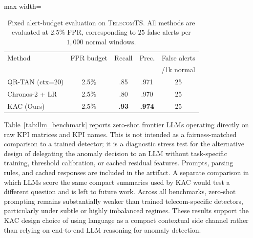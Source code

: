 \documentclass[conference]{IEEEtran}
\begin{document}
\begin{table}[t]
  \centering
  \caption{Fixed alert-budget evaluation on \textsc{TelecomTS}. All methods are evaluated at $2.5\%$ FPR, corresponding to $25$ false alerts per $1{,}000$ normal windows.}
  \label{tab:alert_budget}
  \small
  \setlength{\tabcolsep}{4pt}
  \begin{adjustbox}{max width=\columnwidth}
  \begin{tabular}{@{}lcccc@{}}
    \toprule
    Method & FPR budget & Recall & Prec. & False alerts \\
           &             &        &       & /1k normal \\
    \midrule
    QR-TAN (ctx=20)      & 2.5\% & .85 & .971 & 25 \\
    Chronos-2 + LR       & 2.5\% & .80 & .970 & 25 \\
    KAC (Ours)           & 2.5\% & \textbf{.93} & \textbf{.974} & 25 \\
    \bottomrule
  \end{tabular}
  \end{adjustbox}
\end{table}

Table~\ref{tab:llm_benchmark} reports zero-shot frontier LLMs operating directly on raw KPI matrices and KPI names. This is not intended as a fairness-matched comparison to a trained detector; it is a diagnostic stress test for the alternative design of delegating the anomaly decision to an LLM without task-specific training, threshold calibration, or cached residual features. Prompts, parsing rules, and cached responses are included in the artifact. A separate comparison in which LLMs score the same compact summaries used by KAC would test a different question and is left to future work. Across all benchmarks, zero-shot prompting remains substantially weaker than trained telecom-specific detectors, particularly under subtle or highly imbalanced regimes. These results support the KAC design choice of using language as a compact contextual side channel rather than relying on end-to-end LLM reasoning for anomaly detection.
\end{document}
